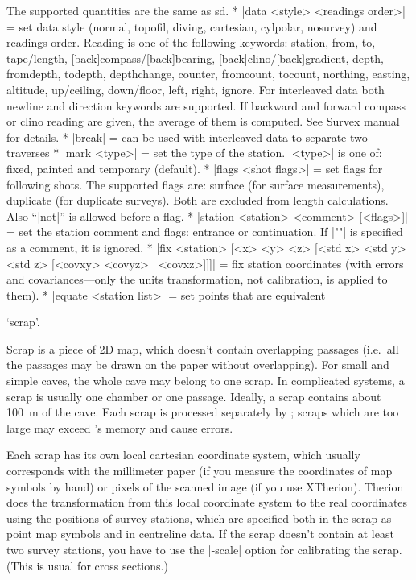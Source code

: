     The supported quantities are the same as sd.
  * |data <style> <readings order>| = set data style (normal, topofil,
    diving, cartesian, cylpolar, nosurvey) and readings order. Reading
    is one of the following keywords: station, from, to, tape/length, 
    [back]compass/[back]bearing, [back]clino/[back]gradient, 
    depth, fromdepth, todepth, depthchange, counter, 
    fromcount, tocount, northing, easting, altitude,
    up/ceiling, down/floor, left, right, ignore. 
    For interleaved data both newline and direction keywords
    are supported. If backward and forward compass or clino
    reading are given, the average of them is computed.
    See Survex manual for details.
  * |break| = can be used with interleaved data to separate two traverses
  * |mark <type>| = set the type of the station. |<type>| is one of: fixed, 
    painted and temporary (default).
  * |flags <shot flags>| = set flags for following shots. The supported
    flags are: surface (for surface measurements), duplicate (for
    duplicate surveys). Both are excluded from length calculations.
    Also ``|not|'' is allowed before a flag.
  * |station <station> <comment> [<flags>]| = set the station comment
    and flags: entrance or continuation. If |""| is specified as a
    comment, it is ignored.
  * |fix <station> [<x> <y> <z> [<std x> <std y> <std z> [<covxy> <covyz> \
<covxz>]]]| 
    = fix station coordinates (with errors and
    covariances---only the units transformation, not calibration,
    is applied to them).
  * |equate <station list>| = set points that are equivalent
\endcomopt





\subsubchapter `scrap'.

\description
  Scrap is a piece of 2D map, which doesn't contain overlapping passages
  (i.e.~all the passages may be drawn on the paper without overlapping).
  For small and simple caves, the whole cave may belong to one scrap. 
  In complicated systems, a scrap is usually one chamber or one passage. 
  Ideally, a scrap contains about 100~m of the cave. Each scrap is processed 
  separately by \MP; scraps which are too large may exceed \MP's memory and 
  cause errors.

  Each scrap has its own local cartesian coordinate system, which usually 
  corresponds with the millimeter paper (if you measure the coordinates of map
  symbols by hand) or pixels of the scanned image (if you use XTherion).
  Therion does the transformation from this local coordinate system to the 
  real coordinates using the positions of survey stations, which are 
  specified both in the scrap as point map symbols and in centreline data.
  If the scrap doesn't contain at least two survey stations, you have
  to use the |-scale| option for calibrating the scrap. (This is usual for
  cross sections.)
\enddescription

